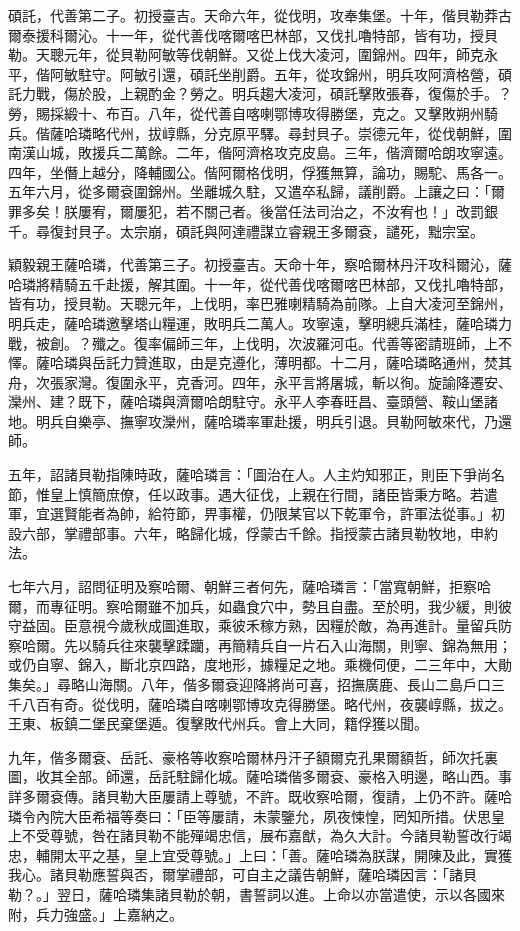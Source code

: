 \begin{pinyinscope}
碩託，代善第二子。初授臺吉。天命六年，從伐明，攻奉集堡。十年，偕貝勒莽古爾泰援科爾沁。十一年，從代善伐喀爾喀巴林部，又伐扎嚕特部，皆有功，授貝勒。天聰元年，從貝勒阿敏等伐朝鮮。又從上伐大凌河，圍錦州。四年，師克永平，偕阿敏駐守。阿敏引還，碩託坐削爵。五年，從攻錦州，明兵攻阿濟格營，碩託力戰，傷於股，上親酌金？勞之。明兵趨大凌河，碩託擊敗張春，復傷於手。？勞，賜採緞十、布百。八年，從代善自喀喇鄂博攻得勝堡，克之。又擊敗朔州騎兵。偕薩哈璘略代州，拔崞縣，分克原平驛。尋封貝子。崇德元年，從伐朝鮮，圍南漢山城，敗援兵二萬餘。二年，偕阿濟格攻克皮島。三年，偕濟爾哈朗攻寧遠。四年，坐僭上越分，降輔國公。偕阿爾格伐明，俘獲無算，論功，賜駝、馬各一。五年六月，從多爾袞圍錦州。坐離城久駐，又遣卒私歸，議削爵。上讓之曰：「爾罪多矣！朕屢宥，爾屢犯，若不關己者。後當任法司治之，不汝宥也！」改罰銀千。尋復封貝子。太宗崩，碩託與阿達禮謀立睿親王多爾袞，譴死，黜宗室。

穎毅親王薩哈璘，代善第三子。初授臺吉。天命十年，察哈爾林丹汗攻科爾沁，薩哈璘將精騎五千赴援，解其圍。十一年，從代善伐喀爾喀巴林部，又伐扎嚕特部，皆有功，授貝勒。天聰元年，上伐明，率巴雅喇精騎為前隊。上自大凌河至錦州，明兵走，薩哈璘邀擊塔山糧運，敗明兵二萬人。攻寧遠，擊明總兵滿桂，薩哈璘力戰，被創。？殲之。復率偏師三年，上伐明，次波羅河屯。代善等密請班師，上不懌。薩哈璘與岳託力贊進取，由是克遵化，薄明都。十二月，薩哈璘略通州，焚其舟，次張家灣。復圍永平，克香河。四年，永平言將屠城，斬以徇。旋諭降遷安、灤州、建？既下，薩哈璘與濟爾哈朗駐守。永平人李春旺昌、臺頭營、鞍山堡諸地。明兵自樂亭、撫寧攻灤州，薩哈璘率軍赴援，明兵引退。貝勒阿敏來代，乃還師。

五年，詔諸貝勒指陳時政，薩哈璘言：「圖治在人。人主灼知邪正，則臣下爭尚名節，惟皇上慎簡庶僚，任以政事。遇大征伐，上親在行間，諸臣皆秉方略。若遣軍，宜選賢能者為帥，給符節，畀事權，仍限某官以下乾軍令，許軍法從事。」初設六部，掌禮部事。六年，略歸化城，俘蒙古千餘。指授蒙古諸貝勒牧地，申約法。

七年六月，詔問征明及察哈爾、朝鮮三者何先，薩哈璘言：「當寬朝鮮，拒察哈爾，而專征明。察哈爾雖不加兵，如蟲食穴中，勢且自盡。至於明，我少緩，則彼守益固。臣意視今歲秋成圖進取，乘彼禾稼方熟，因糧於敵，為再進計。量留兵防察哈爾。先以騎兵往來襲擊蹂躪，再簡精兵自一片石入山海關，則寧、錦為無用；或仍自寧、錦入，斷北京四路，度地形，據糧足之地。乘機伺便，二三年中，大勛集矣。」尋略山海關。八年，偕多爾袞迎降將尚可喜，招撫廣鹿、長山二島戶口三千八百有奇。從伐明，薩哈璘自喀喇鄂博攻克得勝堡。略代州，夜襲崞縣，拔之。王東、板鎮二堡民棄堡遁。復擊敗代州兵。會上大同，籍俘獲以聞。

九年，偕多爾袞、岳託、豪格等收察哈爾林丹汗子額爾克孔果爾額哲，師次托裏圖，收其全部。師還，岳託駐歸化城。薩哈璘偕多爾袞、豪格入明邊，略山西。事詳多爾袞傳。諸貝勒大臣屢請上尊號，不許。既收察哈爾，復請，上仍不許。薩哈璘令內院大臣希福等奏曰：「臣等屢請，未蒙鑒允，夙夜悚惶，罔知所措。伏思皇上不受尊號，咎在諸貝勒不能殫竭忠信，展布嘉猷，為久大計。今諸貝勒誓改行竭忠，輔開太平之基，皇上宜受尊號。」上曰：「善。薩哈璘為朕謀，開陳及此，實獲我心。諸貝勒應誓與否，爾掌禮部，可自主之議告朝鮮，薩哈璘因言：「諸貝勒？。」翌日，薩哈璘集諸貝勒於朝，書誓詞以進。上命以亦當遣使，示以各國來附，兵力強盛。」上嘉納之。


\end{pinyinscope}
